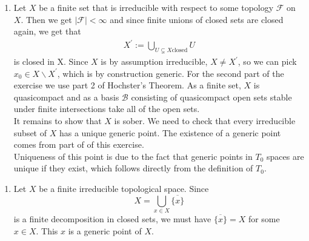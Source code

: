 \newcommand{\sheet}{3}




\maketitle{}

\begin{exercise}{1}
    \begin{enumerate}
        \item Let $X$ be a finite set that is irreducible with 
        respect to some topology $\mathcal{F}$ on $X$. Then we get
        $\mid \mathcal{F} \mid<\infty$ and since finite unions of
        closed sets are closed again, we get that
        \begin{align*}
            X^{\prime}:=\bigcup_{U \subsetneq X \text{closed}}{U}
        \end{align*}
        is closed in X. Since $X$ is by assumption irreducible,
        $X\neq X^{\prime}$, so we can pick $x_0\in X \backslash X^{\prime}$,
        which is by construction generic. For the second part of the exercise we use 
        part 2 of Hochster's Theorem. As a finite set, $X$ is 
        quasicompact and as a basis $\mathcal{B}$ consisting of quasicompact 
        open sets stable under finite intersections take all of the open sets. \\
        It remains to show that $X$ is sober. We need to check that every irreducible
        subset of $X$ has a unique generic point. The existence of a generic point comes
        from part of of this exercise. \\
        Uniqueness of this point is due to the fact
        that generic points in $T_0$ spaces are unique if they exist, which follows directly
        from the definition of $T_0$. 
    \end{enumerate}
    
    \begin{enumerate}
        \item{Let $X$ be a finite irreducible topological space. Since
            \begin{equation*}
                X = \bigcup_{x \in X} \overline{\{x\}}
            \end{equation*}
            is a finite decomposition in closed sets, we must have
            $\overline{\{x\}} = X$ for some $x \in X$. This $x$ is a generic
            point of $X$.

}
\end{enumerate}
\end{exercise}
